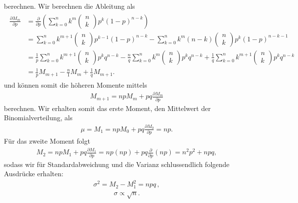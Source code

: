 berechnen. Wir berechnen die Ableitung als
\begin{align}
\begin{split}
\frac{ \partial M_m }{ \partial p } &= \frac{ \partial }{ \partial p } \left( \sum_{k = 0}^n k^m \begin{pmatrix} n \\ k \end{pmatrix} p^k (1 - p)^{n-k} \right)\\
&= \sum_{k = 0}^n k^{m + 1} \begin{pmatrix} n \\ k \end{pmatrix} p^{k - 1} (1 - p)^{n - k} - \sum_{k = 0}^n k^m (n - k) \begin{pmatrix} n \\ k \end{pmatrix} p^k (1 - p)^{n - k - 1}\\
&= \frac{1}{p} \sum_{k = 0}^n k^{m + 1} \begin{pmatrix} n \\ k \end{pmatrix} p^k q^{n - k} - \frac{n}{q} \sum_{k = 0}^n k^m \begin{pmatrix} n \\ k \end{pmatrix} p^k q^{n - k} + \frac{1}{q} \sum_{k = 0}^n k^{m + 1} \begin{pmatrix} n \\ k \end{pmatrix} p^k q^{n - k}\\
&= \frac{1}{p} M_{m + 1} - \frac{n}{1} M_m + \frac{1}{q} M_{m + 1}.
\end{split}
\end{align}
und können somit die höheren Momente mittels 
\begin{align}
M_{m + 1} = n p M_m + p q \frac{ \partial M_m }{ \partial p } 
\end{align}
berechnen. Wir erhalten somit das erste Moment, den Mittelwert der Binomialverteilung, als 
\begin{align}
\mu = M_1 = n p M_0 + p q \frac{ \partial M_0 }{ \partial p } = np.
\end{align}
Für das zweite Moment folgt
\begin{align}
M_2 = n p M_1 + p q \frac{ \partial M_1 }{ \partial p } = np(np) + pq \frac{ \partial }{ \partial p } (np) = n^2 p^2 + npq ,
\end{align}
sodass wir für Standardabweichung und die Varianz schlussendlich folgende Ausdrücke erhalten:
\begin{align}
\sigma^2 = M_2 - M_1^2 = n p q \,,
\end{align}
\begin{align}
\sigma \propto \sqrt{n}.
\end{align}

